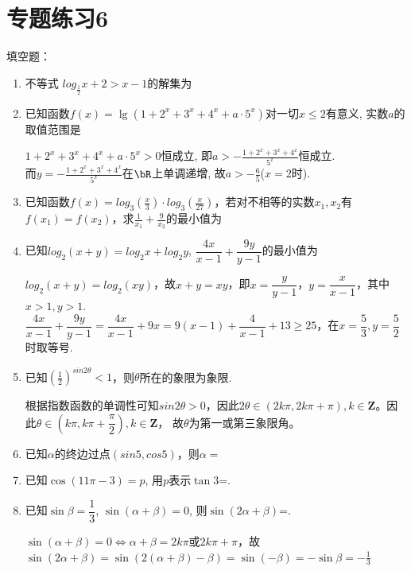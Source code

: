\chapter*{专题练习6}
填空题：
\begin{enumerate}
    \item 不等式 $log_{\frac{1}{2}}x+2 > x-1$的解集为
    \item 已知函数$f(x)=\lg(1+2^x+3^x+4^x+a\cdot5^x)$对一切$x\leq 2$有意义, 实数$a$的取值范围是
    \begin{jieda}
    $1+2^x+3^x+4^x+a\cdot5^x>0$恒成立, 即$a>-\frac{1+2^x+3^x+4^x}{5^x}$恒成立. \\
    而$y=-\frac{1+2^x+3^x+4^x}{5^x}$在$\bR$上单调递增, 故$a>-\frac{6}{5}$($x=2$时). 
    \end{jieda}
    \item 已知函数$f(x) = log_3(\frac{x}{3}) \cdot log_3(\frac{x}{27})$，若对不相等的实数$x_1, x_2$有$f(x_1) = f(x_2)$，求$\frac{1}{x_1} + \frac{9}{x_2}$的最小值为
    \item 已知$log_2(x+y) = log_2x+log_2y$, $\dfrac{4x}{x-1} + \dfrac{9y}{y-1}$的最小值为
    \begin{jieda}
        $log_2(x+y) = log_2(xy)$，故$x+y = xy$，即$x = \dfrac{y}{y-1}$，$y = \dfrac{x}{x-1}$，其中$x > 1, y > 1$.\\
        $\dfrac{4x}{x-1} + \dfrac{9y}{y-1} = \dfrac{4x}{x-1} + 9x = 9(x-1) + \dfrac{4}{x-1}+13 \geq 25$，在$x = \dfrac{5}{3}, y = \dfrac{5}{2}$时取等号.
    \end{jieda}
    \item 已知$(\frac{1}{2})^{sin2\theta} < 1$，则$\theta$所在的象限为象限.
    \begin{jieda}
        根据指数函数的单调性可知$sin2\theta > 0$，因此$2\theta \in (2k\pi, 2k\pi+\pi), k \in \mathbf{Z}$。因此$\theta \in (k\pi, k\pi+\dfrac{\pi}{2}), k \in \mathbf{Z}$， 故$\theta$为第一或第三象限角。
    \end{jieda}
    \item 已知$\alpha$的终边过点$(sin5, cos5)$，则$\alpha = $
    \item 已知$\cos(11\pi-3)=p$, 用$p$表示$\tan3$=. 
    \item 已知$\sin\beta=\dfrac{1}{3}$, $\sin(\alpha+\beta)=0$, 则$\sin(2\alpha+\beta)$=. 
    \begin{jieda}
    $\sin(\alpha+\beta)=0\iff\alpha+\beta=2k\pi$或$2k\pi + \pi$，故 $\sin(2\alpha+\beta) = \sin(2(\alpha+\beta) - \beta) = \sin(-\beta) = -\sin\beta = -\frac{1}{3}$

\end{jieda}
\end{enumerate}
